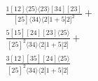 \documentclass[varwidth, border=5pt]{standalone}
\begin{document}
\begin{my}
$\begin{gathered}
\scriptscriptstyle\frac{1[12]⟨25⟩⟨23⟩[34][23]}{[25]⟨34⟩⟨2|1+5|2]^2}+\\
\scriptscriptstyle\frac{5[15][24][23]⟨25⟩}{[25]^2⟨34⟩⟨2|1+5|2]}+\\
\scriptscriptstyle\frac{3[12][35][24]⟨25⟩}{[25]^2⟨34⟩⟨2|1+5|2]}\phantom{+}
\end{gathered}$
\end{my}
\end{document}
